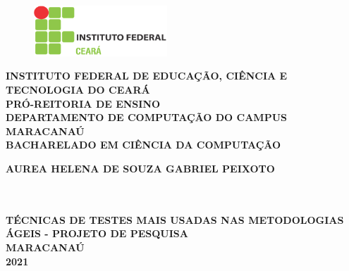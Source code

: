 \thispagestyle{empty}

\vfill
 \begin{center}
    \begin{figure}[t]
     \centering
            \includegraphics[width=5cm]{./figures/IF_logo.png}\\[-0.1in]
     \end{figure}

    {\large\bfseries INSTITUTO FEDERAL DE EDUCAÇÃO, CIÊNCIA E TECNOLOGIA DO CEARÁ} \\
    {\large\bfseries PRÓ-REITORIA DE ENSINO} \\
    {\large\bfseries DEPARTAMENTO DE COMPUTAÇÃO DO CAMPUS MARACANAÚ}  \\ 
    {\large\bfseries BACHARELADO EM CIÊNCIA DA COMPUTAÇÃO}  \\ 

    \vspace*{1in}
    \begin{large} \bfseries AUREA HELENA DE SOUZA GABRIEL PEIXOTO\end{large}\\[0.4in]

    \vspace*{4cm}
    \noindent \\
    \large\bfseries{T{\'E}CNICAS DE TESTES MAIS USADAS NAS METODOLOGIAS {\'A}GEIS - PROJETO DE PESQUISA } \\
    \vfill
    \large\bfseries{ MARACANAÚ \\ 2021}
\end{center}

\normalsize
